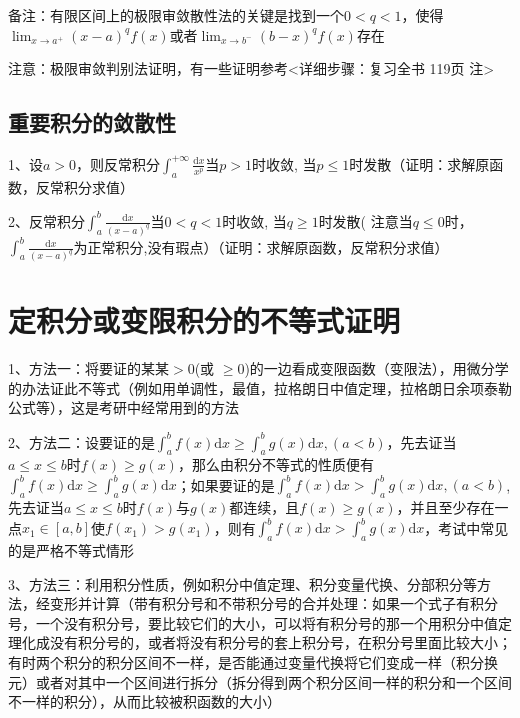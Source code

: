 备注：有限区间上的极限审敛散性法的关键是找到一个$0<q<1$，使得$\lim_{x \rightarrow a^{+}}(x-a)^{q} f(x)$或者$\lim_{x \rightarrow b^{-}}(b-x)^{q} f(x)$存在

注意：极限审敛判别法证明，有一些证明参考<详细步骤：复习全书 119页 注>



\subsection{重要积分的敛散性}

1、设$a>0$，则反常积分$\int_{a}^{+\infty} \frac{\mathrm{d} x}{x^{p}}$当$p>1$时收敛, 当$p \leqslant 1$时发散（证明：求解原函数，反常积分求值）

2、反常积分$\int_{a}^{b} \frac{\mathrm{d} x}{(x-a)^{q}}$当$0<q<1$时收敛, 当$q \geqslant 1$时发散( 注意当$q \leqslant 0$时，$\int_{a}^{b} \frac{\mathrm{d} x}{(x-a)^{q}}$为正常积分,没有瑕点）（证明：求解原函数，反常积分求值）

\section{定积分或变限积分的不等式证明}

1、方法一：将要证的某某$\gt 0$(或 $\ge 0$)的一边看成变限函数（变限法），用微分学的办法证此不等式（例如用单调性，最值，拉格朗日中值定理，拉格朗日余项泰勒公式等），这是考研中经常用到的方法

2、方法二：设要证的是$\int_{a}^{b} f(x) \mathrm{d} x \geqslant \int_{a}^{b} g(x) \mathrm{d} x,(a<b)$，先去证当$a \leqslant x \leqslant b$时$f(x) \geqslant g(x)$，那么由积分不等式的性质便有 $\int_{a}^{b} f(x) \mathrm{d} x \geqslant \int_{a}^{b} g(x) \mathrm{d} x$；如果要证的是$\int_{a}^{b} f(x) \mathrm{d} x>\int_{a}^{b} g(x) \mathrm{d} x,(a<b)$, 先去证当$a \leqslant x \leqslant b$时$f(x)$与$g(x)$都连续，且$f(x) \geqslant g(x)$，并且至少存在一点$x_{1} \in[a, b]$使$f\left(x_{1}\right)>g\left(x_{1}\right)$，则有$\int_{a}^{b} f(x) \mathrm{d} x>\int_{a}^{b} g(x) \mathrm{d} x$，考试中常见的是严格不等式情形

3、方法三：利用积分性质，例如积分中值定理、积分变量代换、分部积分等方法，经变形并计算（带有积分号和不带积分号的合并处理：如果一个式子有积分号，一个没有积分号，要比较它们的大小，可以将有积分号的那一个用积分中值定理化成没有积分号的，或者将没有积分号的套上积分号，在积分号里面比较大小；有时两个积分的积分区间不一样，是否能通过变量代换将它们变成一样（积分换元）或者对其中一个区间进行拆分（拆分得到两个积分区间一样的积分和一个区间不一样的积分），从而比较被积函数的大小）

